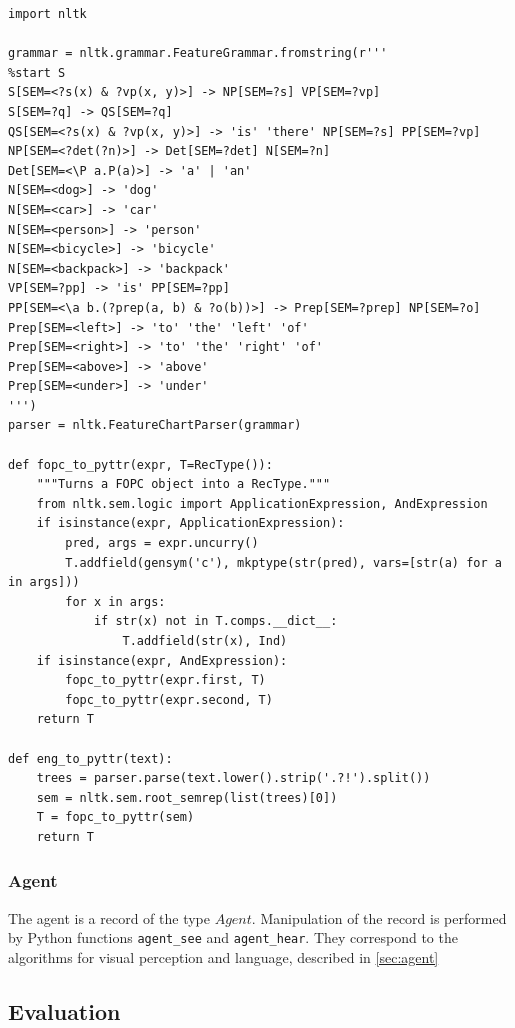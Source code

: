 \begin{lstlisting}[label=lst:grammar, caption=Basic parsing of natural language into PyTTR object]
import nltk

grammar = nltk.grammar.FeatureGrammar.fromstring(r'''
%start S
S[SEM=<?s(x) & ?vp(x, y)>] -> NP[SEM=?s] VP[SEM=?vp]
S[SEM=?q] -> QS[SEM=?q]
QS[SEM=<?s(x) & ?vp(x, y)>] -> 'is' 'there' NP[SEM=?s] PP[SEM=?vp]
NP[SEM=<?det(?n)>] -> Det[SEM=?det] N[SEM=?n]
Det[SEM=<\P a.P(a)>] -> 'a' | 'an'
N[SEM=<dog>] -> 'dog'
N[SEM=<car>] -> 'car'
N[SEM=<person>] -> 'person'
N[SEM=<bicycle>] -> 'bicycle'
N[SEM=<backpack>] -> 'backpack'
VP[SEM=?pp] -> 'is' PP[SEM=?pp]
PP[SEM=<\a b.(?prep(a, b) & ?o(b))>] -> Prep[SEM=?prep] NP[SEM=?o]
Prep[SEM=<left>] -> 'to' 'the' 'left' 'of'
Prep[SEM=<right>] -> 'to' 'the' 'right' 'of'
Prep[SEM=<above>] -> 'above'
Prep[SEM=<under>] -> 'under'
''')
parser = nltk.FeatureChartParser(grammar)

def fopc_to_pyttr(expr, T=RecType()):
    """Turns a FOPC object into a RecType."""
    from nltk.sem.logic import ApplicationExpression, AndExpression
    if isinstance(expr, ApplicationExpression):
        pred, args = expr.uncurry()
        T.addfield(gensym('c'), mkptype(str(pred), vars=[str(a) for a in args]))
        for x in args:
            if str(x) not in T.comps.__dict__:
                T.addfield(str(x), Ind)
    if isinstance(expr, AndExpression):
        fopc_to_pyttr(expr.first, T)
        fopc_to_pyttr(expr.second, T)
    return T

def eng_to_pyttr(text):
    trees = parser.parse(text.lower().strip('.?!').split())
    sem = nltk.sem.root_semrep(list(trees)[0])
    T = fopc_to_pyttr(sem)
    return T
\end{lstlisting}



\subsubsection{Agent}
\label{sec:implagent}


The agent is a record of the type $Agent$.
Manipulation of the record is performed by Python functions \texttt{agent\_see} and \texttt{agent\_hear}.
They correspond to the algorithms for visual perception and language, described in \autoref{sec:agent}



\subsection{Evaluation}

